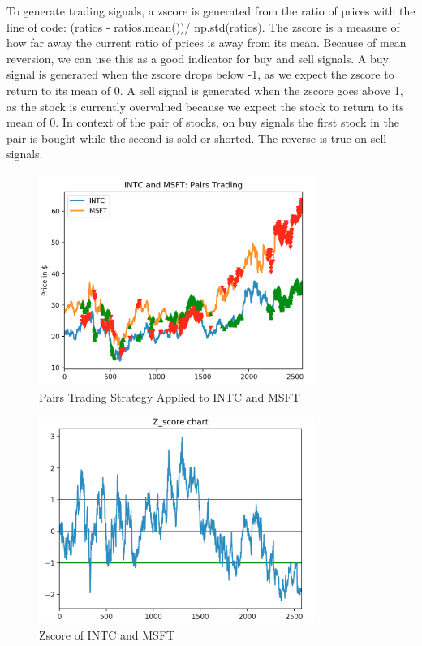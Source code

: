 \documentclass[letterpaper,11pt]{article}
\begin{document}
To generate trading signals, a zscore is generated from the ratio of prices with the line of code: (ratios - ratios.mean())/ np.std(ratios). The zscore is a measure of how far away the current ratio of prices is away from its mean. Because of mean reversion, we can use this as a good indicator for buy and sell signals. A buy signal is generated when the zscore drops below -1, as we expect the zscore to return to its mean of 0. A sell signal is generated when the zscore goes above 1, as the stock is currently overvalued because we expect the stock to return to its mean of 0\cite{Fu2009}. In context of the pair of stocks, on buy signals the first stock in the pair is bought while the second is sold or shorted. The reverse is true on sell signals. 

\begin{figure}[ht!]
\centering
\includegraphics[width=90mm]{Intc_msft_signals.png}
\caption{Pairs Trading Strategy Applied to INTC and MSFT \label{overflow}}
\end{figure}

\begin{figure}[ht!]
\centering
\includegraphics[width=90mm]{zscore.png}
\caption{Zscore of INTC and  MSFT \label{overflow}}
\end{figure}
\end{document}
